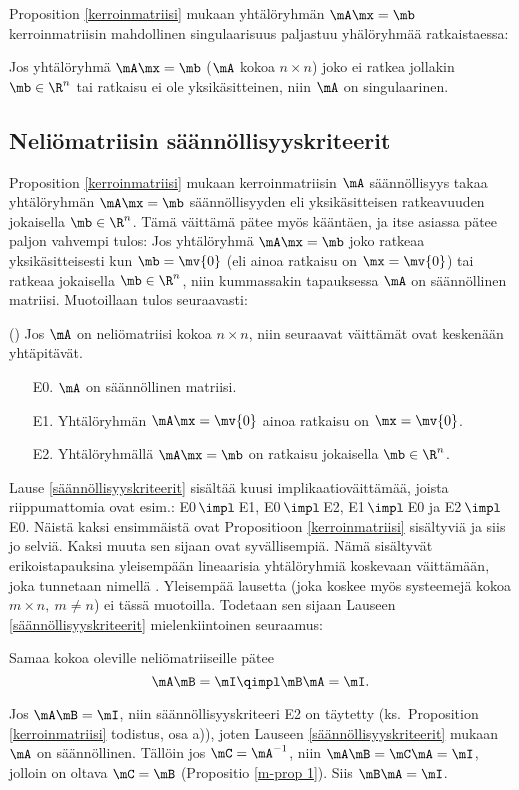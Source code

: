 Proposition \ref{kerroinmatriisi} mukaan yhtälöryhmän $\mA\mx=\mb$ kerroinmatriisin mahdollinen
singulaarisuus paljastuu yhälöryhmää ratkaistaessa:
\begin{Kor} \label{singulaarisuuskriteeri} Jos yhtälöryhmä $\mA\mx=\mb$ 
($\mA$ kokoa $n \times n$) joko ei ratkea jollakin $\mb\in\R^n$ tai ratkaisu ei ole
yksikäsitteinen, niin $\mA$ on singulaarinen.
\end{Kor}

\subsection{Neliömatriisin säännöllisyyskriteerit}

Proposition \ref{kerroinmatriisi} mukaan kerroinmatriisin $\mA$ säännöllisyys takaa
yhtälöryhmän $\mA\mx=\mb$ säännöllisyyden eli yksikäsitteisen ratkeavuuden jokaisella
$\mb\in\R^n$. Tämä väittämä pätee myös kääntäen, ja itse asiassa pätee paljon vahvempi tulos:
Jos yhtälöryhmä $\mA\mx=\mb$ joko ratkeaa yksikäsitteisesti kun $\mb=\mv{0}$ (eli ainoa
ratkaisu on $\mx=\mv{0}$) tai ratkeaa jokaisella $\mb\in\R^n$, niin kummassakin tapauksessa
$\mA$ on säännöllinen matriisi. Muotoillaan tulos seuraavasti:
\begin{*Lause} () \label{säännöllisyyskriteerit}
 Jos $\mA$ on
neliömatriisi kokoa $n \times n$, niin seuraavat väittämät ovat keskenään yhtäpitävät.
\begin{itemize}
\item[E0.] $\mA$ on säännöllinen matriisi.
\item[E1.] Yhtälöryhmän $\mA\mx=\mv{0}$ ainoa ratkaisu on $\mx=\mv{0}$.
\item[E2.] Yhtälöryhmällä $\mA\mx=\mb$ on ratkaisu jokaisella $\mb\in\R^n$.
\end{itemize}
\end{*Lause}
Lause \ref{säännöllisyyskriteerit} sisältää kuusi implikaatioväittämää, joista riippumattomia
ovat esim.: E0\,$\impl$\,E1, E0\,$\impl$\,E2, E1\,$\impl$\,E0 ja E2\,$\impl$\,E0. Näistä 
kaksi ensimmäistä ovat Propositioon \ref{kerroinmatriisi} sisältyviä ja siis jo selviä.
Kaksi muuta sen sijaan ovat syvällisempiä. Nämä sisältyvät erikoistapauksina yleisempään
lineaarisia yhtälöryhmiä koskevaan väittämään, joka tunnetaan nimellä 
. Yleisempää lausetta (joka koskee myös systeemejä kokoa 
$m \times n,\ m \neq n$) ei tässä muotoilla. Todetaan sen sijaan Lauseen
\ref{säännöllisyyskriteerit} mielenkiintoinen seuraamus:
\begin{Kor} \label{ihme} Samaa kokoa oleville neliömatriiseille pätee
\[
\mA\mB=\mI \qimpl \mB\mA=\mI.
\]
\end{Kor}
\tod Jos $\mA\mB=\mI$, niin säännöllisyyskriteeri E2 on täytetty (ks.\ Proposition
\ref{kerroinmatriisi} todistus, osa a)), joten Lauseen \ref{säännöllisyyskriteerit} mukaan
$\mA$ on säännöllinen. Tällöin jos $\mC=\mA^{-1}$, niin $\mA\mB=\mC\mA=\mI$, jolloin on oltava
$\mC=\mB$ (Propositio \ref{m-prop 1}). Siis $\mB\mA=\mI$. \loppu

